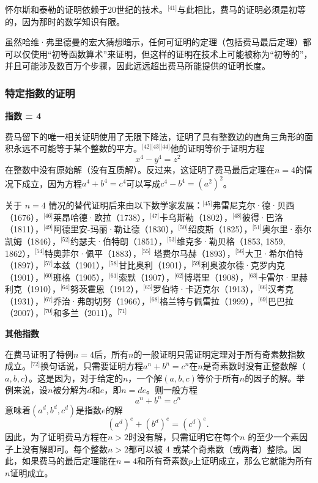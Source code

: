 怀尔斯和泰勒的证明依赖于20世纪的技术。\(^\text{[41]}\)与此相比，费马的证明必须是初等的，因为那时的数学知识有限。

虽然哈维·弗里德曼的宏大猜想暗示，任何可证明的定理（包括费马最后定理）都可以仅使用“初等函数算术”来证明，但这样的证明在技术上可能被称为“初等的”，并且可能涉及数百万个步骤，因此远远超出费马所能提供的证明长度。
\subsubsection{特定指数的证明}
\textbf{指数 = 4}  

费马留下的唯一相关证明使用了无限下降法，证明了具有整数边的直角三角形的面积永远不可能等于某个整数的平方。\(^\text{[42][43][44]}\)他的证明等价于证明方程
\[
x^4 - y^4 = z^2~
\]
在整数中没有原始解（没有互质解）。反过来，这证明了费马最后定理在\( n = 4 \)的情况下成立，因为方程\( a^4 + b^4 = c^4 \)可以写成\( c^4 - b^4 = (a^2)^2 \)。

关于 \( n = 4 \) 情况的替代证明后来由以下数学家发展：\(^\text{[45]}\)弗雷尼克尔·德·贝西（1676），\(^\text{[46]}\)莱昂哈德·欧拉（1738），\(^\text{[47]}\)卡乌斯勒（1802），\(^\text{[48]}\)彼得·巴洛（1811），\(^\text{[49]}\)阿德里安-玛丽·勒让德（1830），\(^\text{[50]}\)绍皮斯（1825），\(^\text{[51]}\)奥尔里·泰尔凯姆（1846），\(^\text{[52]}\)约瑟夫·伯特朗（1851），\(^\text{[53]}\)维克多·勒贝格（1853, 1859, 1862），\(^\text{[54]}\)特奥菲尔·佩平（1883），\(^\text{[55]}\) 塔费尔马赫（1893），\(^\text{[56]}\)大卫·希尔伯特（1897），\(^\text{[57]}\)本兹（1901），\(^\text{[58]}\)甘比奥利（1901），\(^\text{[59]}\)利奥波尔德·克罗内克（1901），\(^\text{[60]}\)班格（1905），\(^\text{[61]}\)索默（1907），\(^\text{[62]}\)博塔里（1908），\(^\text{[63]}\)卡雷尔·里赫利克（1910），\(^\text{[64]}\)努茨霍恩（1912），\(^\text{[65]}\)罗伯特·卡迈克尔（1913），\(^\text{[66]}\)汉考克（1931），\(^\text{[67]}\)乔治·弗朗切努（1966），\(^\text{[68]}\)格兰特与佩雷拉（1999），\(^\text{[69]}\)巴巴拉（2007），\(^\text{[70]}\)和多兰（2011）。\(^\text{[71]}\)

\textbf{其他指数}  

在费马证明了特例\( n = 4 \)后，所有\( n \)的一般证明只需证明定理对于所有奇素数指数成立。\(^\text{[72]}\)换句话说，只需要证明方程\( a^n + b^n = c^n \)在\( n \)是奇素数时没有正整数解（\( a, b, c \)）。这是因为，对于给定的\( n \)，一个解\( (a, b, c)\)等价于所有\( n \)的因子的解。举例来说，设\( n \)被分解为\( d \)和\( e \)，即\( n = de \)。则一般方程
\[
a^n + b^n = c^n~
\]
意味着\( (a^d, b^d, c^d) \)是指数\( e \)的解
\[
(a^d)^e + (b^d)^e = (c^d)^e.~
\]
因此，为了证明费马方程在\( n > 2 \)时没有解，只需证明它在每个\( n \) 的至少一个素因子上没有解即可。每个整数\( n > 2 \)都可以被 4 或某个奇素数（或两者）整除。因此，如果费马的最后定理能在\( n = 4 \)和所有奇素数\( p \)上证明成立，那么它就能为所有\( n \)证明成立。

